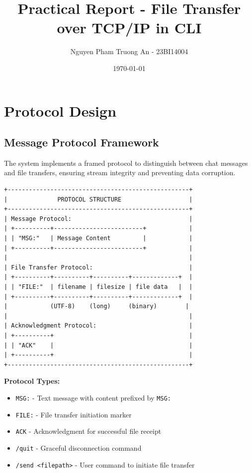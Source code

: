 \documentclass[12pt, letterpaper]{article}
\title{Practical Report - File Transfer over TCP/IP in CLI}
\author{Nguyen Pham Truong An - 23BI14004}
\date{\today}
\begin{document}
\maketitle

\section{Protocol Design}

\subsection{Message Protocol Framework}
The system implements a framed protocol to distinguish between chat messages and file transfers, ensuring stream integrity and preventing data corruption.

\begin{verbatim}
+---------------------------------------------------+
|              PROTOCOL STRUCTURE                   |
+---------------------------------------------------+
| Message Protocol:                                 |
| +----------+-------------------------+            |
| | "MSG:"   | Message Content         |            |
| +----------+-------------------------+            |
|                                                   |
| File Transfer Protocol:                           |
| +----------+----------+----------+-------------+  |
| | "FILE:"  | filename | filesize | file data   |  |
| +----------+----------+----------+-------------+  |
|            (UTF-8)    (long)     (binary)        |
|                                                   |
| Acknowledgment Protocol:                          |
| +----------+                                      |
| | "ACK"    |                                      |
| +----------+                                      |
+---------------------------------------------------+
\end{verbatim}

\textbf{Protocol Types:}
\begin{itemize}
    \item \texttt{MSG:} - Text message with content prefixed by \texttt{MSG:}
    \item \texttt{FILE:} - File transfer initiation marker
    \item \texttt{ACK} - Acknowledgment for successful file receipt
    \item \texttt{/quit} - Graceful disconnection command
    \item \texttt{/send <filepath>} - User command to initiate file transfer
\end{itemize}
\end{document}
